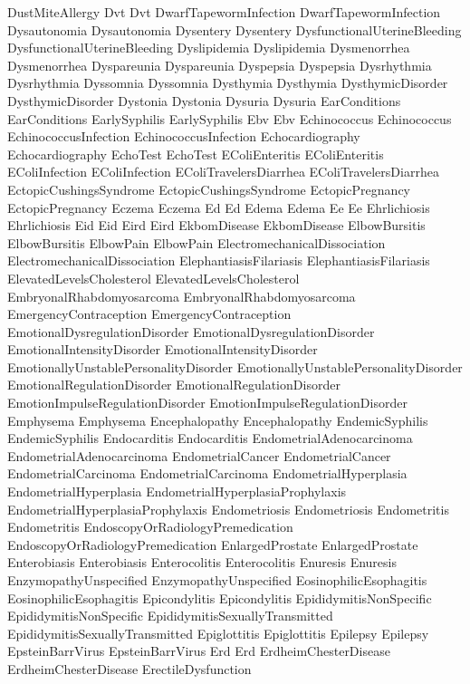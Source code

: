  DustMiteAllergy
 Dvt
 Dvt
 DwarfTapewormInfection
 DwarfTapewormInfection
 Dysautonomia
 Dysautonomia
 Dysentery
 Dysentery
 DysfunctionalUterineBleeding
 DysfunctionalUterineBleeding
 Dyslipidemia
 Dyslipidemia
 Dysmenorrhea
 Dysmenorrhea
 Dyspareunia
 Dyspareunia
 Dyspepsia
 Dyspepsia
 Dysrhythmia
 Dysrhythmia
 Dyssomnia
 Dyssomnia
 Dysthymia
 Dysthymia
 DysthymicDisorder
 DysthymicDisorder
 Dystonia
 Dystonia
 Dysuria
 Dysuria
 EarConditions
 EarConditions
 EarlySyphilis
 EarlySyphilis
 Ebv
 Ebv
 Echinococcus
 Echinococcus
 EchinococcusInfection
 EchinococcusInfection
 Echocardiography
 Echocardiography
 EchoTest
 EchoTest
 EColiEnteritis
 EColiEnteritis
 EColiInfection
 EColiInfection
 EColiTravelersDiarrhea
 EColiTravelersDiarrhea
 EctopicCushingsSyndrome
 EctopicCushingsSyndrome
 EctopicPregnancy
 EctopicPregnancy
 Eczema
 Eczema
 Ed
 Ed
 Edema
 Edema
 Ee
 Ee
 Ehrlichiosis
 Ehrlichiosis
 Eid
 Eid
 Eird
 Eird
 EkbomDisease
 EkbomDisease
 ElbowBursitis
 ElbowBursitis
 ElbowPain
 ElbowPain
 ElectromechanicalDissociation
 ElectromechanicalDissociation
 ElephantiasisFilariasis
 ElephantiasisFilariasis
 ElevatedLevelsCholesterol
 ElevatedLevelsCholesterol
 EmbryonalRhabdomyosarcoma
 EmbryonalRhabdomyosarcoma
 EmergencyContraception
 EmergencyContraception
 EmotionalDysregulationDisorder
 EmotionalDysregulationDisorder
 EmotionalIntensityDisorder
 EmotionalIntensityDisorder
 EmotionallyUnstablePersonalityDisorder
 EmotionallyUnstablePersonalityDisorder
 EmotionalRegulationDisorder
 EmotionalRegulationDisorder
 EmotionImpulseRegulationDisorder
 EmotionImpulseRegulationDisorder
 Emphysema
 Emphysema
 Encephalopathy
 Encephalopathy
 EndemicSyphilis
 EndemicSyphilis
 Endocarditis
 Endocarditis
 EndometrialAdenocarcinoma
 EndometrialAdenocarcinoma
 EndometrialCancer
 EndometrialCancer
 EndometrialCarcinoma
 EndometrialCarcinoma
 EndometrialHyperplasia
 EndometrialHyperplasia
 EndometrialHyperplasiaProphylaxis
 EndometrialHyperplasiaProphylaxis
 Endometriosis
 Endometriosis
 Endometritis
 Endometritis
 EndoscopyOrRadiologyPremedication
 EndoscopyOrRadiologyPremedication
 EnlargedProstate
 EnlargedProstate
 Enterobiasis
 Enterobiasis
 Enterocolitis
 Enterocolitis
 Enuresis
 Enuresis
 EnzymopathyUnspecified
 EnzymopathyUnspecified
 EosinophilicEsophagitis
 EosinophilicEsophagitis
 Epicondylitis
 Epicondylitis
 EpididymitisNonSpecific
 EpididymitisNonSpecific
 EpididymitisSexuallyTransmitted
 EpididymitisSexuallyTransmitted
 Epiglottitis
 Epiglottitis
 Epilepsy
 Epilepsy
 EpsteinBarrVirus
 EpsteinBarrVirus
 Erd
 Erd
 ErdheimChesterDisease
 ErdheimChesterDisease
 ErectileDysfunction
